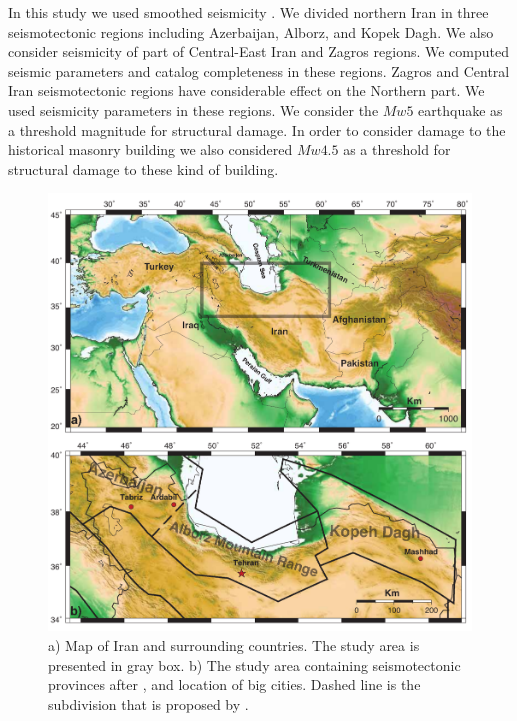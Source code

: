 In this study we used smoothed seismicity \citep{Frankel1995}. We divided northern Iran in three seismotectonic regions including Azerbaijan, Alborz, and Kopek Dagh. We also consider seismicity of part of Central-East Iran and Zagros regions. We computed seismic parameters and catalog completeness in these regions. Zagros and Central Iran seismotectonic regions have considerable effect on the Northern part. We used \citet{Karimiparidari2013} seismicity parameters in these regions.  We consider the $Mw5$ earthquake as a threshold magnitude  for structural damage. In order to consider damage to the historical masonry building we also considered $Mw4.5$ as a threshold for structural damage to these kind of building. 


\begin{figure} [H]
\centering
\includegraphics[scale=0.7]{figures/pdf/Figure1.pdf} 
\caption{ a) Map of Iran and surrounding countries. The study area is presented in gray box. b) The study area containing seismotectonic provinces after \citet{Mirzaei1998}, and location of big cities. Dashed line is the subdivision that is proposed by \citet{Karimiparidari2013}. }
 
\label{fig:Iran}
\end{figure}






